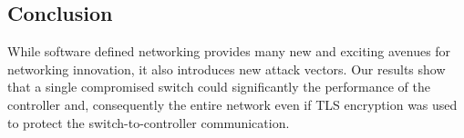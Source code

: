 \documentclass[11pt, letterpaper, twocolumn, twoside]{article}
\begin{document}
\begin{spacing}{1.0}
\section{Conclusion}
While software defined networking provides many new and exciting avenues for networking innovation, it also introduces new attack vectors. Our results show that a single compromised switch could significantly the performance of the controller and, consequently the entire network even if TLS encryption was used to protect the switch-to-controller communication. 





\end{spacing}
\end{document}
